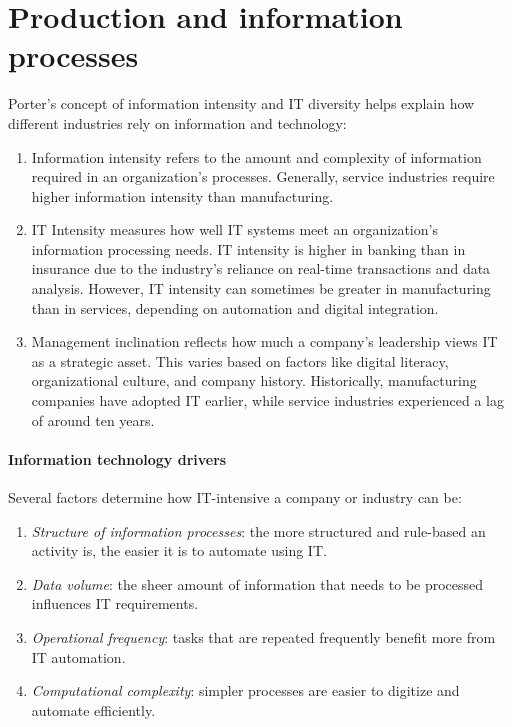 \section{Production and information processes}

Porter's concept of information intensity and IT diversity helps explain how different industries rely on information and technology:
\begin{enumerate}
    \item Information intensity refers to the amount and complexity of information required in an organization's processes. 
     Generally, service industries require higher information intensity than manufacturing.
    \item IT Intensity measures how well IT systems meet an organization's information processing needs. 
        IT intensity is higher in banking than in insurance due to the industry's reliance on real-time transactions and data analysis.
        However, IT intensity can sometimes be greater in manufacturing than in services, depending on automation and digital integration.
    \item Management inclination reflects how much a company's leadership views IT as a strategic asset. 
        This varies based on factors like digital literacy, organizational culture, and company history.
        Historically, manufacturing companies have adopted IT earlier, while service industries experienced a lag of around ten years.
\end{enumerate}

\paragraph*{Information technology drivers}
Several factors determine how IT-intensive a company or industry can be:
\begin{enumerate}
    \item \textit{Structure of information processes}: the more structured and rule-based an activity is, the easier it is to automate using IT.
    \item \textit{Data volume}: the sheer amount of information that needs to be processed influences IT requirements.
    \item \textit{Operational frequency}: tasks that are repeated frequently benefit more from IT automation.
    \item \textit{Computational complexity}: simpler processes are easier to digitize and automate efficiently.
\end{enumerate}

